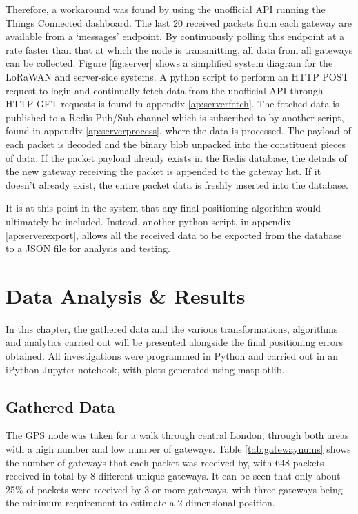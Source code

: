 \documentclass[a4paper]{report}
\begin{document}
    Therefore, a workaround was found by using the unofficial API running the Things Connected dashboard. The last 20 received packets from each gateway are available from a `messages' endpoint. By continuously polling this endpoint at a rate faster than that at which the node is transmitting, all data from all gateways can be collected. Figure \ref{fig:server} shows a simplified system diagram for the LoRaWAN and server-side systems. A python script to perform an HTTP POST request to login and continually fetch data from the unofficial API through HTTP GET requests is found in appendix \ref{ap:serverfetch}. The fetched data is published to a Redis Pub/Sub channel which is subscribed to by another script, found in appendix \ref{ap:serverprocess}, where the data is processed. The payload of each packet is decoded and the binary blob unpacked into the constituent pieces of data. If the packet payload already exists in the Redis database, the details of the new gateway receiving the packet is appended to the gateway list. If it doesn't already exist, the entire packet data is freshly inserted into the database.

    It is at this point in the system that any final positioning algorithm would ultimately be included. Instead, another python script, in appendix \ref{ap:serverexport}, allows all the received data to be exported from the database to a JSON file for analysis and testing.



\chapter{Data Analysis \& Results}

  In this chapter, the gathered data and the various transformations, algorithms and analytics carried out will be presented alongside the final positioning errors obtained. All investigations were programmed in Python and carried out in an iPython Jupyter notebook, with plots generated using matplotlib.

  \section{Gathered Data}

    The GPS node was taken for a walk through central London, through both areas with a high number and low number of gateways. Table \ref{tab:gatewaynums} shows the number of gateways that each packet was received by, with 648 packets received in total by 8 different unique gateways. It can be seen that only about 25\% of packets were received by 3 or more gateways, with three gateways being the minimum requirement to estimate a 2-dimensional position.
\end{document}
